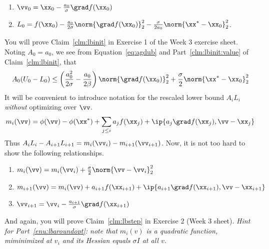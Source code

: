 \newpage

\begin{claim}
  \label{clm:lbinit}
  \noindent
  \begin{enumerate}
  \item $\vv_0 = \xx_0 - \frac{a_0}{\sigma} \grad f(\xx_0)$
  \item
    \label{clm:lbinit:value}
    $L_0 = f(\xx_0) - \frac{a_0}{2\sigma} \norm{\grad f(\xx_0)
    }_2^2 - \frac{\sigma }{2 a_0}\norm{ \xx^* - \xx_0}_2^2 $.
\end{enumerate}
\end{claim}
You will prove Claim~\ref{clm:lbinit} in Exercise 1 of the Week 3 exercise sheet.
Noting $A_0 = a_0$,
we see from Equation~\eqref{eq:agdub} and Part~\ref{clm:lbinit:value}
of Claim~\ref{clm:lbinit}, that
\begin{align}
 \label{eq:gapinit}
 A_0( U_0 - L_0 ) \leq
 \left(
 \frac{a_0^2}{2\sigma}
 -
   \frac{a_0}{2\beta}
 \right)
 \norm{\grad f(\xx_0)}_2^2
   +
   \frac{\sigma }{2}\norm{ \xx^* - \xx_0}_2^2
\end{align}
It will be convenient to introduce notation for the
rescaled lower bound $A_iL_i$ \emph{without} optimizing over $\vv$.
\[
 m_i(\vv) =
 \phi(\vv)
  - \phi(\xx^*)
 +
 \sum_{j \leq i} a_j  f(\xx_j)
   + \ip{ a_j\grad
     f(\xx_{j}) ,\vv - \xx_j}
 \]
Thus $A_iL_i-A_{i+1}L_{i+1} = m_{i}(\vv_i) - m_{i+1}(\vv_{i+1})$.
Now, it is not too hard to show the
following relationships.
\begin{claim}
 \label{clm:lbstep}
  \noindent
  \begin{enumerate}
  \item
    \label{enu:lbaroundopt}
    $ m_{i}(\vv) = m_{i}(\vv_i) + \frac{\sigma}{2} \norm{ \vv -
  \vv_i}_2^2$
  \item  $m_{i+1}(\vv) = m_{i}(\vv)
    + a_{i+1}  f(\xx_{i+1})
    + \ip{ a_{i+1}\grad
     f(\xx_{i+1}) ,\vv - \xx_{i+1}}$
 \item  $\vv_{i+1} = \vv_i -  \frac{a_{i+1}}{\sigma} \grad f(\xx_{i+1})$
  \end{enumerate}
\end{claim}
And again, you will prove Claim~\ref{clm:lbstep} in Exercise 2 (Week
3 sheet).
\emph{Hint for Part~\ref{enu:lbaroundopt}: note that $m_i(v)$ is a quadratic function, miminimized at $v_i$ and
 its Hessian equals $\sigma I$ at all $v$.}

